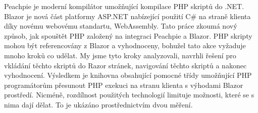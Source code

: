 \documentclass[12pt]{report}
\begin{document}
Peachpie je moderní kompilátor umožňující kompilace PHP skriptů do .NET.
Blazor je nová část platformy ASP.NET nabízející použití C\# na straně klienta díky novému webovému standartu, WebAssembly.
Tato práce zkoumá nový způsob, jak spouštět PHP založený na integraci Peachpie a Blazor.
PHP skripty mohou být referencovány z Blazor a vyhodnoceny, bohužel tato akce vyžaduje mnoho kroků co udělat.
My jsme tyto kroky analyzovali, navrhli řešení pro vkládání těchto skriptů do Razor stránek, navigování těchto skriptů a nakonec vyhodnocení. Výsledkem je knihovna obsahující pomocné třídy umožňující PHP programátorům přesunout PHP exekuci na stranu klienta s výhodami Blazor prostředí.
Nicméně, rozdílnost použitých technologií limituje možnosti, které se s nima dají dělat.
To je ukázáno prostřednictvím dvou měření.   
\end{document}
